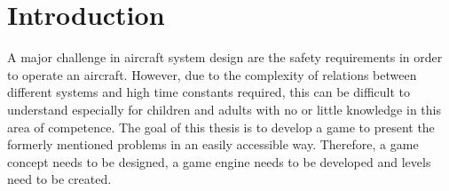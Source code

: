\section{Introduction}\label{sec:introduction}
A major challenge in aircraft system design are the safety requirements in order to operate an aircraft.
However, due to the complexity of relations between different systems and high time constants required, this can be difficult
to understand especially for children and adults with no or little knowledge in this area of competence.
The goal of this thesis is to develop a game to present the formerly mentioned problems in an easily
accessible way.
Therefore, a game concept needs to be designed, a game engine needs to be developed and levels need to be created.